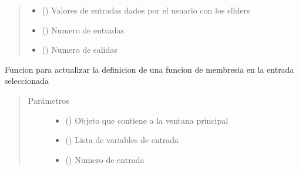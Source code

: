 \documentclass[letterpaper,10pt,spanish]{sphinxmanual}
\begin{document}
\begin{fulllineitems}
\begin{fulllineitems}
\begin{quote}
\begin{description}
\begin{itemize}
\item {} 
 () \textendash{} Valores de entradas dados por el usuario con los sliders

\item {} 
 () \textendash{} Numero de entradas

\item {} 
 () \textendash{} Numero de salidas

\end{itemize}

\end{description}\end{quote}

\end{fulllineitems}


\begin{fulllineitems}
\label{\detokenize{codigos/rutinas_fuzzy:rutinas_fuzzy.FuzzyController.update_definicion_input}}
Funcion para actualizar la definicion de una funcion de membresia en la entrada seleccionada
\begin{quote}\begin{description}
\item[{Parámetros}] \leavevmode\begin{itemize}
\item {} 
 () \textendash{} Objeto que contiene a la ventana principal

\item {} 
 () \textendash{} Lista de variables de entrada

\item {} 
 () \textendash{} Numero de entrada


\end{itemize}
\end{description}
\end{quote}
\end{fulllineitems}
\end{fulllineitems}
\end{document}
